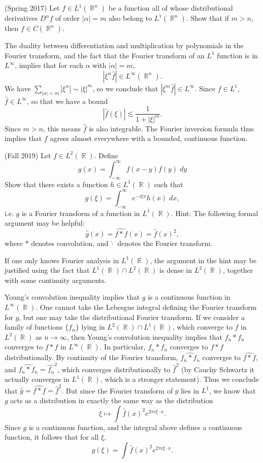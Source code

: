 \documentclass[answers]{exam}
\DeclareMathOperator{\RR}{\mathbb{R}}
\theoremstyle{problemstyle}
\newcommand{\1}[1]{\textbf{1}_{\left[#1\right]}} %
\begin{document}
\begin{questions}
\question (Spring 2017) Let $f \in L^1(\RR^n)$ be a function all of whose distributional derivatives $D^\alpha f$ of order $|\alpha| = m$ also belong to $L^1(\RR^n)$. Show that if $m > n$, then $f \in C(\RR^n)$.
\begin{solution}
    The duality between differentiation and multiplication by polynomials in the Fourier transform, and the fact that the Fourier transform of an $L^1$ function is in $L^\infty$, implies that for each $\alpha$ with $|\alpha| = m$,
    \[ |\xi^\alpha \widehat{f}| \in L^\infty(\RR^n). \]
    We have $\sum_{|\alpha| = m} |\xi^\alpha| \sim |\xi|^m$, so we conclude that $|\xi^m \widehat{f}| \in L^\infty$. Since $f \in L^1$, $\widehat{f} \in L^\infty$, so that we have a bound
    \[ |\widehat{f}(\xi)| \lesssim \frac{1}{1 + |\xi|^m}. \]
    Since $m > n$, this means $\widehat{f}$ is also integrable. The Fourier inversion formula thus implies that $f$ agrees almost everywhere with a bounded, continuous function.
\end{solution}

\question (Fall 2019) Let $f \in L^2(\RR)$. Define
%
\[ g(x) = \int_{-\infty}^\infty f(x-y) f(y)\; dy \]
%
Show that there exists a function $h \in L^1(\RR)$ such that
%
\[ g(\xi) = \int_{-\infty}^\infty e^{- i \xi x} h(x)\; dx, \]
%
i.e. $g$ is a Fourier transform of a function in $L^1(\RR)$. Hint: The following formal argument may be helpful:
%
\[ \widehat{g}(x) = \widehat{f * f}(x) = \widehat{f}(x)^2, \]
%
where $*$ denotes convolution, and $\widehat{\cdot}$ denotes the Fourier transform.
\begin{solution}
    If one only knows Fourier analysis in $L^1(\RR)$, the argument in the hint may be justified using the fact that $L^1(\RR) \cap L^2(\RR)$ is dense in $L^2(\RR)$, together with some continuity arguments.
    
    Young's convolution inequality implies that $g$ is a continuous function in $L^\infty(\RR)$. One cannot take the Lebesgue integral defining the Fourier transform for $g$, but one may take the distributional Fourier transform. If we consider a family of functions $\{ f_n \}$ lying in $L^2(\RR) \cap L^1(\RR)$, which converge to $f$ in $L^2(\RR)$ as $n \to \infty$, then Young's convolution inequality implies that $f_n * f_n$ converges to $f * f$ in $L^\infty(\RR)$. In particular, $f_n * f_n$ converges to $f * f$ distributionally. By continuity of the Fourier transform, $\widehat{f_n * f_n}$ converges to $\widehat{f * f}$, and $\widehat{f_n * f_n} = \widehat{f_n}^2$, which converges distributionally to $\widehat{f}^2$ (by Cauchy Schwartz it actually converges in $L^1(\RR)$, which is a stronger statement). Thus we conclude that $\widehat{g} = \widehat{f * f} = \widehat{f}^2$. But since the Fourier transform of $g$ lies in $L^1$, we know that $g$ acts as a distribution in exactly the same way as the distribution
    \[ \xi \mapsto \int \widehat{f}(x)^2 e^{2 \pi i \xi \cdot x}. \]
    Since $g$ is a continuous function, and the integral above defines a continuous function, it follows that for all $\xi$,
    \[ g(\xi) = \int \widehat{f}(x)^2 e^{2 \pi i \xi \cdot x}. \]
\end{solution}


\end{questions}
\end{document}
